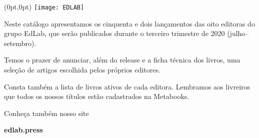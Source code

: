 \begin{textblock*}{5.625in}(0pt,0pt)%
\vspace*{-3cm}
\hspace*{-2.1cm}\texttt{[image: EDLAB]}
\end{textblock*}

\pagebreak

\pagestyle{indice}

{}

\vspace{1.2cm}

{}


\hspace*{-7cm}\hrulefill\hspace*{-7cm}

\vspace{1cm}

\hspace*{-.5cm}\parbox{180pt}{\raggedright 
Neste catálogo apresentamos os cinquenta e dois
lançamentos das oito editoras do grupo EdLab, que serão publicados durante o
terceiro trimestre de 2020 (julho--setembro). 

Temos o prazer de anunciar, além do release e a ficha técnica dos livros, uma 
seleção de artigos escolhida pelos próprios editores. 

Consta também a lista de 
livros ativos de cada editora. Lembramos aos livreiros que todos os nossos títulos
estão cadastrados na Metabooks.

Conheça também nosso site

{\Formular\textbf{edlab.press}}
} %


